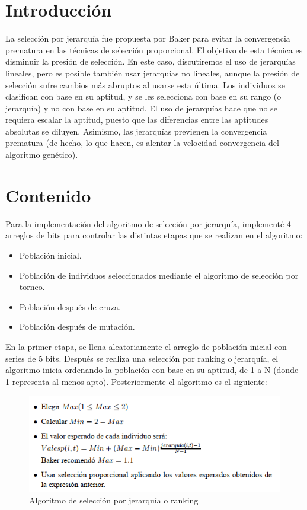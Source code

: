 \documentclass[11pt,letterpaper]{article}
\begin{document}


\section*{Introducción}

La selección por jerarquía fue propuesta por Baker para evitar la convergencia prematura en las técnicas de selección proporcional. El objetivo de esta técnica es disminuir la presión de selección. En este caso, discutiremos el uso de jerarquías lineales, pero es posible también usar jerarquías no lineales, aunque la presión de selección sufre cambios más abruptos al usarse esta última.
Los individuos se clasifican con base en su aptitud, y se les selecciona con
base en su rango (o jerarquía) y no con base en su aptitud. El uso de jerarquías
hace que no se requiera escalar la aptitud, puesto que las diferencias entre las
aptitudes absolutas se diluyen. Asimismo, las jerarquías previenen la convergencia prematura (de hecho, lo que hacen, es alentar la velocidad convergencia del
algoritmo genético).

\section*{Contenido}
Para la implementación del algoritmo de selección por jerarquía, implementé 4 arreglos de bits para controlar las distintas etapas que se realizan en el algoritmo:
\begin{itemize}
	\item Población inicial.
	\item Población de individuos seleccionados mediante el algoritmo de selección por torneo.
	\item Población después de cruza.
	\item Población después de mutación.
\end{itemize}


En la primer etapa, se llena aleatoriamente el arreglo de población inicial con series de 5 bits. Después se realiza una selección por ranking o jerarquía, el algoritmo inicia ordenando la población con base en su aptitud, de 1 a N (donde 1 representa al menos apto). Posteriormente el algoritmo es el siguiente:


\begin{figure}[H]
	\centering
	\includegraphics[scale = 1]{images/algo}
	\caption{Algoritmo de selección por jerarquía o ranking}
\end{figure}
\end{document}
